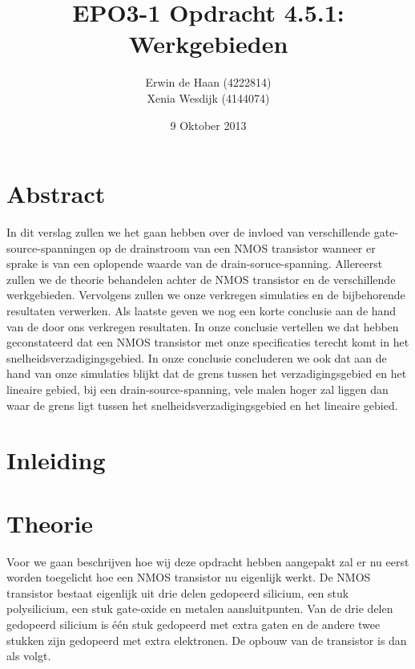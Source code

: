 \documentclass{scrartcl}  %
\author{Erwin {de Haan} (4222814)  \\{Xenia Wesdijk} (4144074)}
\title{EPO3-1   Opdracht 4.5.1: Werkgebieden}
\date{9 Oktober 2013}
\begin{document}
\maketitle
{}
\vspace{80 mm}
\section*{Abstract}
In dit verslag zullen we het gaan hebben over de invloed van verschillende gate-source-spanningen op de drainstroom van een NMOS transistor wanneer er sprake is van een oplopende waarde van de drain-soruce-spanning. Allereerst zullen we de theorie behandelen achter de NMOS transistor en de verschillende werkgebieden. Vervolgens zullen we onze verkregen simulaties en de bijbehorende resultaten verwerken. Als laatste geven we nog een korte conclusie aan de hand van de door ons verkregen resultaten. In onze conclusie vertellen we dat hebben geconstateerd dat een NMOS transistor met onze specificaties terecht komt in het snelheidsverzadigingsgebied. In onze conclusie concluderen we ook dat aan de hand van onze simulaties blijkt dat de grens tussen het verzadigingsgebied en het lineaire gebied, bij een drain-source-spanning, vele malen hoger zal liggen dan waar de grens ligt tussen het snelheidsverzadigingsgebied en het lineaire gebied.
\newpage
\setlength{\cftbeforetoctitleskip}{-3em}
\tableofcontents

\section{Inleiding}

\newpage


\section{Theorie}
Voor we gaan beschrijven hoe wij deze opdracht hebben aangepakt zal er nu eerst worden toegelicht hoe een NMOS transistor nu eigenlijk werkt. De NMOS transistor bestaat eigenlijk uit drie delen gedopeerd silicium, een stuk polysilicium, een stuk gate-oxide en metalen aansluitpunten. Van de drie delen gedopeerd silicium is één stuk gedopeerd met extra gaten en de andere twee stukken zijn gedopeerd met extra elektronen. De opbouw van de transistor is dan als volgt.
\end{document}
